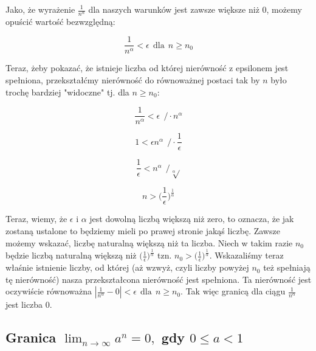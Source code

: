 \documentclass[a4paper,oneside,openright,11pt]{article}
\numberwithin{equation}{section}
\begin{document}
Jako, że wyrażenie $\frac{1}{n^\alpha}$ dla naszych warunków jest zawsze większe niż $0$, możemy opuścić wartość bezwzględną:

\begin{equation*}
    \frac{1}{n^\alpha} < \epsilon \ \ \textrm{dla} \ \ n \geq n_0
\end{equation*}

\vspace{10mm}

Teraz, żeby pokazać, że istnieje liczba od której nierówność z epsilonem jest spełniona, przekształćmy nierówność do równoważnej postaci
tak by $n$ było trochę bardziej "widoczne" tj. dla $n \geq n_0$:

\begin{equation*}
    \frac{1}{n^\alpha} < \epsilon \ \  / \cdot n^\alpha
\end{equation*}

\begin{equation*}
    1 < \epsilon n^\alpha \ \  / \cdot \frac{1}{\epsilon}
\end{equation*}

\begin{equation*}
    \frac{1}{\epsilon} < n^\alpha \ \  / \sqrt[\alpha]{}
\end{equation*}

\begin{equation*}
    n > \big(\frac{1}{\epsilon}\big)^{\frac{1}{\alpha}}
\end{equation*}


Teraz, wiemy, że $\epsilon$ i $\alpha$ jest dowolną liczbą większą niż zero, to oznacza, że jak zostaną ustalone to będziemy mieli
po prawej stronie jakąś liczbę. Zawsze możemy wskazać, liczbę naturalną większą niż ta liczba. Niech w takim razie $n_0$ będzie
liczbą naturalną większą niż $\big(\frac{1}{\epsilon}\big)^{\frac{1}{\alpha}}$ tzn. $n_{0} > \big(\frac{1}{\epsilon}\big)^{\frac{1}{\alpha}}$.
Wskazaliśmy teraz właśnie istnienie liczby, od której (aż wzwyż, czyli liczby powyżej $n_0$ też spełniają tę nierówność) nasza przekształcona nierówność
jest spełniona. Ta nierówność jest oczywiście równoważna $|\frac{1}{n^\alpha} - 0| < \epsilon \ \ \textrm{dla} \ \ n \geq n_0$.
Tak więc granicą dla ciągu $\frac{1}{n^{\alpha}}$ jest liczba $0$.


\subsection{Granica $\lim_{n\to\infty} a^{n} = 0,$ gdy $0 \leq a < 1$}
\end{document}
